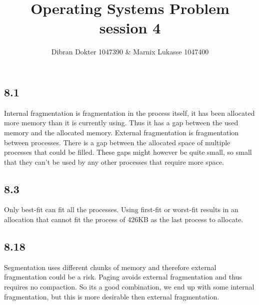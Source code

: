 \documentclass[]{article}
\title{Operating Systems Problem session 4}
\author{Dibran Dokter 1047390 \& Marnix Lukasse 1047400}
\begin{document}
\maketitle

\subsection*{8.1}

Internal fragmentation is fragmentation in the process itself, it has been allocated more memory than it is currently using. Thus it has a gap between the used memory and the allocated memory.
External fragmentation is fragmentation between processes. There is a gap between the allocated space of multiple processes that could be filled. These gaps might however be quite small, so small that they can't be used by any other processes that require more space.

\subsection*{8.3}

Only best-fit can fit all the processes. Using first-fit or worst-fit results in an allocation that cannot fit the process of 426KB as the last process to allocate.

\subsection*{8.18}

Segmentation uses different chunks of memory and therefore external fragmentation could be a risk. Paging avoids external fragmentation and thus requires no compaction. So its a good combination, we end up with some internal fragmentation, but this is more desirable then external fragmentation.
\end{document}
